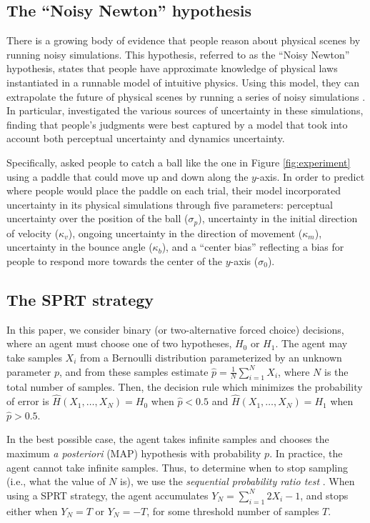\documentclass[10pt,letterpaper]{article}
\begin{document}
\subsection{The ``Noisy Newton'' hypothesis}

There is a growing body of evidence that people reason about physical scenes by running noisy simulations. This hypothesis, referred to as the ``Noisy Newton'' hypothesis, states that people have approximate knowledge of physical laws instantiated in a runnable model of intuitive physics. Using this model, they can extrapolate the future of physical scenes by running a series of noisy simulations \cite{Smith:2013fc,Battaglia2013,Smith:2013ug,Smith:2013th,Smith:2014tx,Ullman:2014ut,Hamrick:2015}. In particular,  investigated the various sources of uncertainty in these simulations, finding that people's judgments were best captured by a model that took into account both perceptual uncertainty and dynamics uncertainty.

Specifically,  asked people to catch a ball like the one in Figure \ref{fig:experiment} using a paddle that could move up and down along the $y$-axis. In order to predict where people would place the paddle on each trial, their model incorporated uncertainty in its physical simulations through five parameters: perceptual uncertainty over the position of the ball ($\sigma_p$), uncertainty in the initial direction of velocity ($\kappa_v$), ongoing uncertainty in the direction of movement ($\kappa_m$), uncertainty in the bounce angle ($\kappa_b$), and a ``center bias'' reflecting a bias for people to respond more towards the center of the $y$-axis ($\sigma_0$).

\subsection{The SPRT strategy}

In this paper, we consider binary (or two-alternative forced choice) decisions, where an agent must choose one of two hypotheses, $H_0$ or $H_1$. The agent may take samples $X_i$ from a Bernoulli distribution parameterized by an unknown parameter $p$, and from these samples estimate $\hat{p}=\frac{1}{N}\sum_{i=1}^N X_i$, where $N$ is the total number of samples. Then, the decision rule which minimizes the probability of error is $\hat{H}(X_1,\ldots{},X_N)=H_0$ when $\hat{p}<0.5$ and $\hat{H}(X_1,\ldots{},X_N)=H_1$ when $\hat{p}>0.5$.

In the best possible case, the agent takes infinite samples and chooses the maximum \emph{a posteriori} (MAP) hypothesis with probability $p$. In practice, the agent cannot take infinite samples. Thus, to determine when to stop sampling (i.e., what the value of $N$ is), we use the \emph{sequential probability ratio test} \cite{wald1947sequential}. When using a SPRT strategy, the agent accumulates $Y_N=\sum_{i=1}^N 2X_i-1$, and stops either when $Y_N=T$ or $Y_N=-T$, for some threshold number of samples $T$. 
\end{document}

